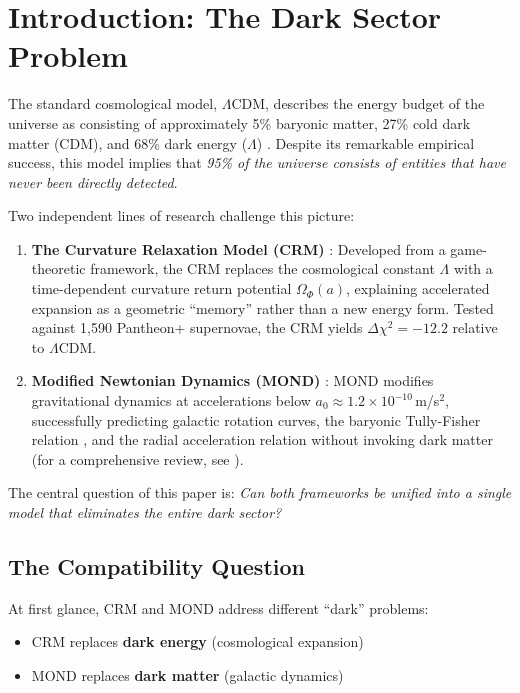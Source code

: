 \documentclass[aps,prd,twocolumn,superscriptaddress,nofootinbib,floatfix]{revtex4-2}
\begin{document}
\section{Introduction: The Dark Sector Problem}
\label{sec:intro}

The standard cosmological model, $\Lambda$CDM, describes the energy budget of the universe as consisting of approximately 5\% baryonic matter, 27\% cold dark matter (CDM), and 68\% dark energy ($\Lambda$) \cite{Planck2020}. Despite its remarkable empirical success, this model implies that \textit{95\% of the universe consists of entities that have never been directly detected}.

Two independent lines of research challenge this picture:

\begin{enumerate}
\item \textbf{The Curvature Relaxation Model (CRM)} \cite{Geiger2026}: Developed from a game-theoretic framework, the CRM replaces the cosmological constant $\Lambda$ with a time-dependent curvature return potential $\Omega_\Phi(a)$, explaining accelerated expansion as a geometric ``memory'' rather than a new energy form. Tested against 1,590 Pantheon+ supernovae, the CRM yields $\Delta\chi^2 = -12.2$ relative to $\Lambda$CDM.

\item \textbf{Modified Newtonian Dynamics (MOND)} \cite{Milgrom1983}: MOND modifies gravitational dynamics at accelerations below $a_0 \approx 1.2 \times 10^{-10}$\,m/s$^2$, successfully predicting galactic rotation curves, the baryonic Tully-Fisher relation \cite{McGaugh2016}, and the radial acceleration relation \cite{Lelli2017} without invoking dark matter (for a comprehensive review, see \cite{FamaeyMcGaugh2012}).
\end{enumerate}

The central question of this paper is: \textit{Can both frameworks be unified into a single model that eliminates the entire dark sector?}

\subsection{The Compatibility Question}

At first glance, CRM and MOND address different ``dark'' problems:
\begin{itemize}
\item CRM replaces \textbf{dark energy} (cosmological expansion)
\item MOND replaces \textbf{dark matter} (galactic dynamics)
\end{itemize}
\end{document}
